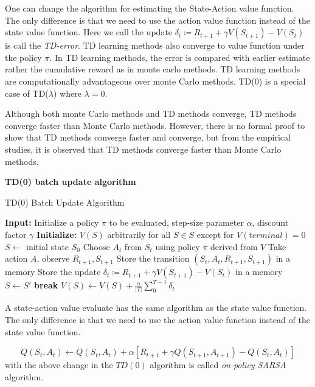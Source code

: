 \documentclass[../main.tex]{subfiles}
\begin{document}
One can change the algorithm for estimating the State-Action value function. The only difference is that we need to use the action value function instead of the state value function. 
Here we call the update $ \delta_t \coloneqq R_{t+1} + \gamma V(S_{t+1}) - V(S_t)$  is call the \emph{TD-error}.
TD learning methods also converge to value function under the policy $\pi$.
In TD learning methods, the error is compared with earlier estimate rather the cumulative reward as in monte carlo methods. TD learning methods are computationally advantageous over monte Carlo methods. TD(0) is a special case of TD($\lambda$) where $\lambda = 0$.

Although both monte Carlo methods and TD methods converge, TD methods converge faster than Monte Carlo methods. However, there is no formal proof to show that TD methods converge faster and converge, but from the empirical studies, it is observed that TD methods converge faster than Monte Carlo methods.

\textbf{TD(0)  batch update algorithm}

\begin{algorithm}
\caption{TD(0) Batch Update Algorithm}
\begin{algorithmic}[1]
\State \textbf{Input:} Initialize a policy $\pi$ to be evaluated, step-size parameter $\alpha$, discount factor $\gamma$
\State \textbf{Initialize:} $V(S) $ arbitrarily for all $S \in S$ except for $V(terminal) = 0$
\State  $S \leftarrow$ initial state $S_0$
\State  Choose $A_t$ from $S_t$ using policy $\pi$ derived from $V$
\State  Take action $A$, observe $R_{t+1}, S_{t+1}$
\State Store the transition $(S_t, A_t, R_{t+1}, S_{t+1})$ in a memory
\State Store the update $\delta_t \coloneqq R_{t+1} + \gamma V(S_{t+1}) - V(S_t)$ in a memory
\State  $S \leftarrow S'$
\State \textbf{break}
\EndIf
\State $V(S) \gets V(S) + \frac{\alpha}{|T|} \sum_{0}^{T-1} \delta_t$
\EndFor
\EndWhile

\end{algorithmic}
\end{algorithm}

A state-action value evaluate has the same algorithm as the state value function. The only difference is that we need to use the action value function instead of the state value function.

\begin{equation}
Q(S_t, A_t) \leftarrow Q(S_t, A_t) + \alpha \left[ R_{t+1} + \gamma Q(S_{t+1}, A_{t+1}) - Q(S_t, A_t) \right] \nonumber
\end{equation}
with the above change in the $TD(0)$ algorithm is called \emph{on-policy SARSA} algorithm.
\end{document}
